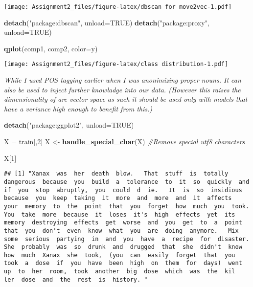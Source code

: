 \documentclass[]{article}
\newenvironment{Shaded}{\begin{snugshade}}{\end{snugshade}}
\newcommand{\CommentTok}[1]{\textcolor[rgb]{0.56,0.35,0.01}{\textit{#1}}}
\newcommand{\DataTypeTok}[1]{\textcolor[rgb]{0.13,0.29,0.53}{#1}}
\newcommand{\DecValTok}[1]{\textcolor[rgb]{0.00,0.00,0.81}{#1}}
\newcommand{\KeywordTok}[1]{\textcolor[rgb]{0.13,0.29,0.53}{\textbf{#1}}}
\newcommand{\NormalTok}[1]{#1}
\newcommand{\OtherTok}[1]{\textcolor[rgb]{0.56,0.35,0.01}{#1}}
\newcommand{\StringTok}[1]{\textcolor[rgb]{0.31,0.60,0.02}{#1}}
\begin{document}
\texttt{[image: Assignment2\_files/figure-latex/dbscan for move2vec-1.pdf]}

\begin{Shaded}
\begin{Highlighting}[]
\KeywordTok{detach}\NormalTok{(}\StringTok{"package:dbscan"}\NormalTok{, }\DataTypeTok{unload=}\OtherTok{TRUE}\NormalTok{)}
\KeywordTok{detach}\NormalTok{(}\StringTok{"package:proxy"}\NormalTok{, }\DataTypeTok{unload=}\OtherTok{TRUE}\NormalTok{)}
\end{Highlighting}
\end{Shaded}

\begin{Shaded}
\begin{Highlighting}[]
\KeywordTok{qplot}\NormalTok{(comp1, comp2, }\DataTypeTok{color=}\NormalTok{y)}
\end{Highlighting}
\end{Shaded}

\texttt{[image: Assignment2\_files/figure-latex/class distribution-1.pdf]}

\emph{While I used POS tagging earlier when I was anonimizing proper
nouns. It can also be used to inject further knowladge into our data.
(However this raises the dimensionality of are vector space as such it
should be used only with models that have a veriance high enough to
benefit from this.)}

\begin{Shaded}
\begin{Highlighting}[]
\KeywordTok{detach}\NormalTok{(}\StringTok{"package:ggplot2"}\NormalTok{, }\DataTypeTok{unload=}\OtherTok{TRUE}\NormalTok{)}

\NormalTok{X =}\StringTok{ }\NormalTok{train[,}\DecValTok{2}\NormalTok{]}
\NormalTok{X <-}\StringTok{ }\KeywordTok{handle_special_char}\NormalTok{(X) }\CommentTok{#Remove special utf8 characters}

\NormalTok{X[}\DecValTok{1}\NormalTok{]}
\end{Highlighting}
\end{Shaded}

\begin{verbatim}
## [1] "Xanax  was  her  death  blow.   That  stuff  is  totally  dangerous  because  you  build  a  tolerance  to  it  so  quickly  and  if  you  stop  abruptly,  you  could  d  ie.   It  is  so  insidious  because  you  keep  taking  it  more  and  more  and  it  affects  your  memory  to  the  point  that  you  forget  how  much  you  took.   You  take  more  because  it  loses  it's  high  effects  yet  its  memory  destroying  effects  get  worse  and  you  get  to  a  point  that  you  don't  even  know  what  you  are  doing  anymore.   Mix  some  serious  partying  in  and  you  have  a  recipe  for  disaster.   She  probably  was  so  drunk  and  drugged  that  she  didn't  know  how  much  Xanax  she  took,  (you  can  easily  forget  that  you  took  a  dose  if  you  have  been  high  on  them  for  days)  went  up  to  her  room,  took  another  big  dose  which  was  the  kil  ler  dose  and  the  rest  is  history. "
\end{verbatim}
\end{document}
